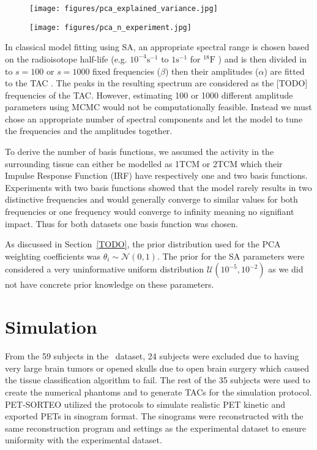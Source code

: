 \begin{figure}[h]
	\centering
	\texttt{[image: figures/pca\_explained\_variance.jpg]}
	\caption{}
\end{figure}
\begin{figure}[h]
	\centering
	\texttt{[image: figures/pca\_n\_experiment.jpg]}
	\caption{}
\end{figure}

In classical model fitting using SA, an appropriate spectral range is chosen based on the radioisotope half-life (e.g. $10^{-4} \mathrm{s}^{-1}$ to $1 \mathrm{s}^{-1}$ for $^{18}\mathrm{F}$ ) and is then divided in to $s=100$ or $s=1000$ fixed frequencies ($\beta$) then their amplitudes ($\alpha$) are fitted to the TAC \cite{TODO}.
The peaks in the resulting spectrum are considered as the [TODO] frequencies of the TAC.
However, estimating 100 or 1000 different amplitude parameters using MCMC would not be computationally feasible.
Instead we must chose an appropriate number of spectral components and let the model to tune the frequencies and the amplitudes together.

To derive the number of basis functions, we assumed the activity in the surrounding tissue can either be modelled as 1TCM or 2TCM which their Impulse Response Function (IRF) have respectively one and two basis functions.
Experiments with two basis functions showed that the model rarely results in two distinctive frequencies and would generally converge to similar values for both frequencies or one frequency would converge to infinity meaning no signifiant impact.
Thus for both datasets one basis function was chosen.

As discussed in Section~\ref{TODO}, the prior distribution used for the PCA weighting coefficients was $\theta_i \sim \mathcal{N}(0,1)$.
The prior for the SA parameters were considered a very uninformative uniform distribution $\mathcal{U}(10^{-5},10^{-2})$ as we did not have concrete prior knowledge on these parameters.


\section{Simulation}
From the 59 subjects in the \fdg $\,$ dataset, 24 subjects were excluded due to having very large brain tumors or opened skulls due to open brain surgery which caused the tissue classification algorithm to fail.
The rest of the 35 subjects were used to create the numerical phantoms and to generate TACs for the simulation protocol.
PET-SORTEO utilized the protocols to simulate realistic PET kinetic and exported PETs in sinogram format.
The sinograms were reconstructed with the same reconstruction program and settings as the experimental dataset to ensure uniformity with the experimental dataset.

